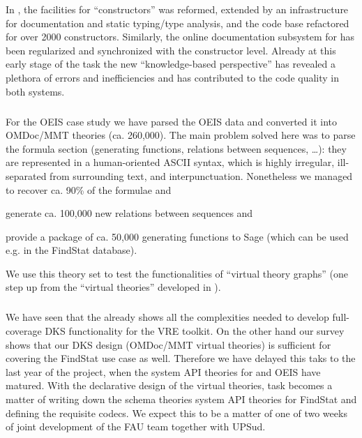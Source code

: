 In \GAP, the facilities for ``constructors'' was reformed, extended by an infrastructure for documentation and static typing/type analysis, and the code base refactored for over 2000 constructors.
Similarly, the online documentation subsystem for \GAP has been regularized and synchronized with the constructor level.
Already at this early stage of the task the new ``knowledge-based perspective'' has revealed a plethora of errors and inefficiencies and has contributed to the code quality in both systems.
\medskip

\subparagraph{}
\label{dksbases@data-OEIS}

For the OEIS case study we have parsed the OEIS data and converted it into OMDoc/MMT theories (ca. 260,000).
The main problem solved here was to parse the formula section (generating functions, relations between sequences, \ldots): they are represented in a human-oriented ASCII syntax, which is highly irregular, ill-separated from surrounding text, and interpunctuation.
Nonetheless we managed to recover ca. 90\% of the formulae and
\begin{compactenum}[\em i\rm)]
\item generate ca. 100,000 new relations between sequences and
\item provide a package of ca. 50,000 generating functions to Sage (which can be used
  e.g. in the FindStat database).
\end{compactenum}
We use this theory set to test the functionalities of ``virtual theory graphs'' (one step up from the ``virtual theories'' developed in ).
\medskip

\subparagraph{}
\label{dksbases@data-findstat}

We have seen that the \LMFDB already shows all the complexities needed to develop full-coverage DKS functionality for the \pn VRE toolkit.
On the other hand our survey shows that our DKS design (OMDoc/MMT virtual theories) is sufficient for covering the FindStat use case as well.
Therefore we have delayed this taks to the last year of the \pn project, when the system API theories for \Sage and OEIS have matured. With the declarative design of the virtual theories, task  becomes a matter of writing down the schema theories system API theories for FindStat and defining the requisite codecs. We expect this to be a matter of one of two weeks of joint development of the FAU team together with UPSud. 
\medskip

